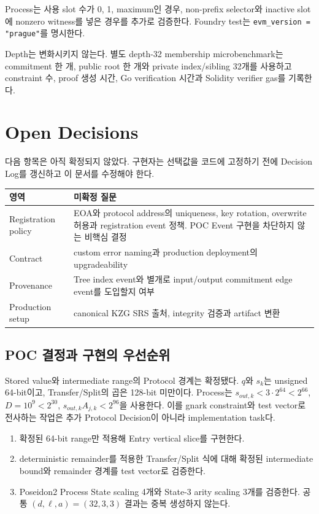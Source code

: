 \documentclass[11pt,a4paper]{extarticle}
\begin{document}
Process는 사용 slot 수가 0, 1, maximum인 경우, non-prefix selector와 inactive slot에
nonzero witness를 넣은 경우를 추가로 검증한다. Foundry test는
\texttt{evm\_version = "prague"}를 명시한다.

Depth는 변화시키지 않는다. 별도 depth-32 membership microbenchmark는 commitment 한 개,
public root 한 개와 private index/sibling 32개를 사용하고 constraint 수, proof 생성 시간,
Go verification 시간과 Solidity verifier gas를 기록한다.

\section{Open Decisions}

다음 항목은 아직 확정되지 않았다. 구현자는 선택값을 코드에 고정하기 전에 Decision
Log를 갱신하고 이 문서를 수정해야 한다.

\begin{longtable}{@{}p{}p{}@{}}
\toprule
영역 & 미확정 질문 \\
\midrule
\endhead
Registration policy & EOA와 protocol address의 uniqueness, key rotation, overwrite 허용과
registration event 정책. POC Event 구현을 차단하지 않는 비핵심 결정 \\
Contract & custom error naming과 production deployment의 upgradeability \\
Provenance & Tree index event와 별개로 input/output commitment edge event를 도입할지 여부 \\
Production setup & canonical KZG SRS 출처, integrity 검증과 artifact 변환 \\
\bottomrule
\end{longtable}

\subsection{POC 결정과 구현의 우선순위}

Stored value와 intermediate range의 Protocol 경계는 확정됐다. $q$와 $s_k$는 unsigned
64-bit이고, Transfer/Split의 곱은 128-bit 미만이다. Process는
$s_{out,k}<3\cdot2^{64}<2^{66}$, $D=10^9<2^{30}$,
$s_{out,k}A_{j,k}<2^{96}$을 사용한다. 이를 gnark constraint와 test vector로 전사하는 작업은
추가 Protocol Decision이 아니라 implementation task다.

\begin{enumerate}
  \item 확정된 64-bit range만 적용해 Entry vertical slice를 구현한다.
  \item deterministic remainder를 적용한 Transfer/Split 식에 대해
        확정된 intermediate bound와 remainder 경계를 test vector로 검증한다.
  \item Poseidon2 Process State scaling 4개와 State-3 arity scaling 3개를 검증한다.
        공통 $(d,\ell,a)=(32,3,3)$ 결과는 중복 생성하지 않는다.
\end{enumerate}
\end{document}
